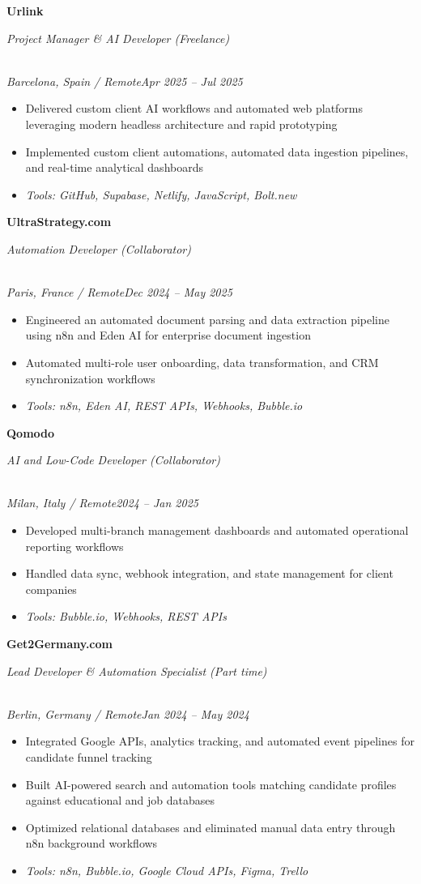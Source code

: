 \documentclass[a4paper,10pt]{article}
\newcommand{\role}[4]{\vspace{2pt}\noindent\hspace{0.6em}\parbox[t]{0.38\textwidth}{\raggedright\textbf{#1}}\hfill\parbox[t]{0.58\textwidth}{\raggedleft\textit{#2}}\\{\textit{#3}\hfill\textit{#4}}\vspace{1pt}}
\begin{document}
\role{Urlink}{Project Manager \& AI Developer (Freelance)}{Barcelona, Spain / Remote}{Apr 2025 -- Jul 2025}
\begin{itemize}
\item Delivered custom client AI workflows and automated web platforms leveraging modern headless architecture and rapid prototyping
\item Implemented custom client automations, automated data ingestion pipelines, and real-time analytical dashboards
\item \textit{Tools: GitHub, Supabase, Netlify, JavaScript, Bolt.new}
\end{itemize}

\role{UltraStrategy.com}{Automation Developer (Collaborator)}{Paris, France / Remote}{Dec 2024 -- May 2025}
\begin{itemize}
\item Engineered an automated document parsing and data extraction pipeline using n8n and Eden AI for enterprise document ingestion
\item Automated multi-role user onboarding, data transformation, and CRM synchronization workflows
\item \textit{Tools: n8n, Eden AI, REST APIs, Webhooks, Bubble.io}
\end{itemize}

\role{Qomodo}{AI and Low-Code Developer (Collaborator)}{Milan, Italy / Remote}{2024 -- Jan 2025}
\begin{itemize}
\item Developed multi-branch management dashboards and automated operational reporting workflows
\item Handled data sync, webhook integration, and state management for client companies
\item \textit{Tools: Bubble.io, Webhooks, REST APIs}
\end{itemize}

\role{Get2Germany.com}{Lead Developer \& Automation Specialist (Part time)}{Berlin, Germany / Remote}{Jan 2024 -- May 2024}
\begin{itemize}
\item Integrated Google APIs, analytics tracking, and automated event pipelines for candidate funnel tracking
\item Built AI-powered search and automation tools matching candidate profiles against educational and job databases
\item Optimized relational databases and eliminated manual data entry through n8n background workflows
\item \textit{Tools: n8n, Bubble.io, Google Cloud APIs, Figma, Trello}
\end{itemize}
\end{document}
